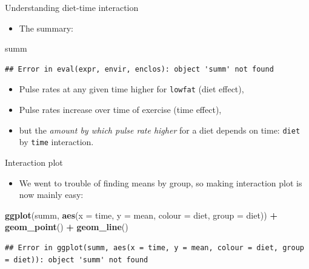 \documentclass[ignorenonframetext,]{beamer}
\newenvironment{Shaded}{\begin{snugshade}}{\end{snugshade}}
\newcommand{\DataTypeTok}[1]{\textcolor[rgb]{0.13,0.29,0.53}{#1}}
\newcommand{\KeywordTok}[1]{\textcolor[rgb]{0.13,0.29,0.53}{\textbf{#1}}}
\newcommand{\NormalTok}[1]{#1}
\newcommand{\OperatorTok}[1]{\textcolor[rgb]{0.81,0.36,0.00}{\textbf{#1}}}
\newcommand{\StringTok}[1]{\textcolor[rgb]{0.31,0.60,0.02}{#1}}
\providecommand{\tightlist}{%
  \setlength{\itemsep}{0pt}\setlength{\parskip}{0pt}}
\begin{document}
\begin{frame}[fragile]{Understanding diet-time interaction}
\protect\hypertarget{understanding-diet-time-interaction}{}

\begin{itemize}
\tightlist
\item
  The summary:
\end{itemize}

\footnotesize

\begin{Shaded}
\begin{Highlighting}[]
\NormalTok{summ}
\end{Highlighting}
\end{Shaded}

\begin{verbatim}
## Error in eval(expr, envir, enclos): object 'summ' not found
\end{verbatim}

\normalsize

\begin{itemize}
\item
  Pulse rates at any given time higher for \texttt{lowfat} (diet
  effect),
\item
  Pulse rates increase over time of exercise (time effect),
\item
  but the \emph{amount by which pulse rate higher} for a diet depends on
  time: \texttt{diet} by \texttt{time} interaction.
\end{itemize}

\end{frame}

\begin{frame}[fragile]{Interaction plot}
\protect\hypertarget{interaction-plot-4}{}

\begin{itemize}
\tightlist
\item
  We went to trouble of finding means by group, so making interaction
  plot is now mainly easy:
\end{itemize}

\begin{Shaded}
\begin{Highlighting}[]
\KeywordTok{ggplot}\NormalTok{(summ, }\KeywordTok{aes}\NormalTok{(}\DataTypeTok{x =}\NormalTok{ time, }\DataTypeTok{y =}\NormalTok{ mean, }\DataTypeTok{colour =}\NormalTok{ diet,}
                 \DataTypeTok{group =}\NormalTok{ diet)) }\OperatorTok{+}\StringTok{ }\KeywordTok{geom_point}\NormalTok{() }\OperatorTok{+}\StringTok{ }\KeywordTok{geom_line}\NormalTok{()}
\end{Highlighting}
\end{Shaded}

\begin{verbatim}
## Error in ggplot(summ, aes(x = time, y = mean, colour = diet, group = diet)): object 'summ' not found
\end{verbatim}

\end{frame}
\end{document}

